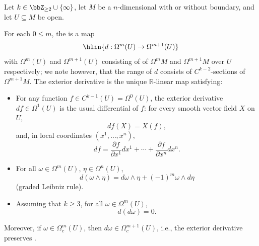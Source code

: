 \begin{definition}\label{definition:exterior_derivative_on_smooth_k_forms_on_a_smooth_manifold}
Let $k \in \bbZ_{\geq 2} \cup \{\infty\}$, let $M$ be a $n$-dimensional  with or without boundary, and let $U \subseteq M$ be open.

For each $0 \leq m$, the  is a map
$$\hlin{d: \Omega^m(U) \to \Omega^{m+1}(U)}$$
with $\Omega^m(U)$ and $\Omega^{m+1}(U)$ consisting of  of $\Omega^m M$ and $\Omega^{m+1} M$ over $U$ respectively; we note however, that the range of $d$ consists of $C^{k-2}$-sections of $\Omega^{m+1} M$. The exterior derivative is the unique $\mathbb{R}$-linear map satisfying:
\begin{itemize}
    \item For any function $f \in C^{k-1}(U) = \Omega^0(U)$, the exterior derivative $df \in \Omega^1(U)$ is the usual differential of $f$: for every smooth vector field $X$ on $U$,
    \[ df(X) = X(f), \]
    and, in local coordinates $(x^1, \ldots, x^n)$,
    \[ df = \frac{\partial f}{\partial x^1} dx^1 + \cdots + \frac{\partial f}{\partial x^n} dx^n.  \]

    \item For all $\omega \in \Omega^m(U)$, $\eta \in \Omega^n(U)$,
    \[ d(\omega \wedge \eta) = d\omega \wedge \eta + (-1)^m \omega \wedge d\eta \]
    (graded Leibniz rule).

    \item Assuming that $k \geq 3$, for all $\omega \in \Omega^m(U)$,
    \[ d(d\omega) = 0.  \]
\end{itemize}
Moreover, if $\omega \in \Omega_c^m(U)$, then $d\omega \in \Omega_c^{m+1}(U)$, i.e., the exterior derivative preserves .
\end{definition}